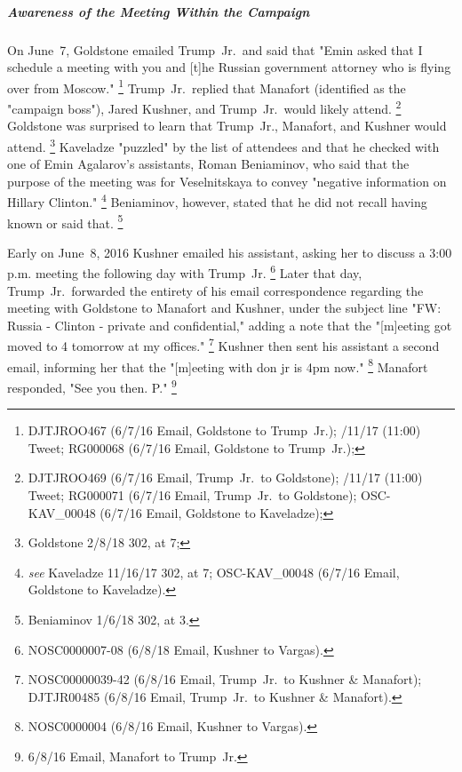 \subparagraph{Awareness of the Meeting Within the Campaign}

On June~7, Goldstone emailed Trump~Jr.\ and said that "Emin asked that I schedule a meeting with you and [t]he Russian government attorney who is flying over from Moscow."%
\footnote{DJTJROO467 (6/7/16 Email, Goldstone to Trump~Jr.);
/11/17 (11:00) Tweet;
RG000068 (6/7/16 Email, Goldstone to Trump~Jr.);
}
Trump~Jr.\ replied that Manafort (identified as the "campaign boss"), Jared Kushner, and Trump~Jr.\ would likely attend.%
\footnote{DJTJROO469 (6/7/16 Email, Trump~Jr.\ to Goldstone);
/11/17 (11:00) Tweet;
RG000071 (6/7/16 Email, Trump~Jr.\ to Goldstone);
OSC-KAV\_00048 (6/7/16 Email, Goldstone to Kaveladze);
}
Goldstone was surprised to learn that Trump~Jr., Manafort, and Kushner would attend.%
\footnote{Goldstone 2/8/18 302, at 7;
}
Kaveladze 
"puzzled" by the list of attendees and that he checked with one of Emin Agalarov's assistants, Roman Beniaminov, who said that the purpose of the meeting was for Veselnitskaya to convey "negative information on Hillary Clinton."%
\footnote{ \textit{see} Kaveladze 11/16/17 302, at 7;
OSC-KAV\_00048 (6/7/16 Email, Goldstone to Kaveladze).}
Beniaminov, however, stated that he did not recall having known or said that.%
\footnote{Beniaminov 1/6/18 302, at 3.}

Early on June~8, 2016 Kushner emailed his assistant, asking her to discuss a 3:00 p.m. meeting the following day with Trump~Jr.%
\footnote{NOSC0000007-08 (6/8/18 Email, Kushner to Vargas).}
Later that day, Trump~Jr.\ forwarded the entirety of his email correspondence regarding the meeting with Goldstone to Manafort and Kushner, under the subject line "FW: Russia - Clinton - private and confidential," adding a note that the "[m]eeting got moved to 4 tomorrow at my offices."%
\footnote{NOSC00000039-42 (6/8/16 Email, Trump~Jr.\ to Kushner \& Manafort);
DJTJR00485 (6/8/16 Email, Trump~Jr.\ to Kushner \& Manafort).}
Kushner then sent his assistant a second email, informing her that the "[m]eeting with don jr is 4pm now."%
\footnote{NOSC0000004 (6/8/16 Email, Kushner to Vargas).}
Manafort responded, "See you then. P."%
\footnote{6/8/16 Email, Manafort to Trump~Jr.}

